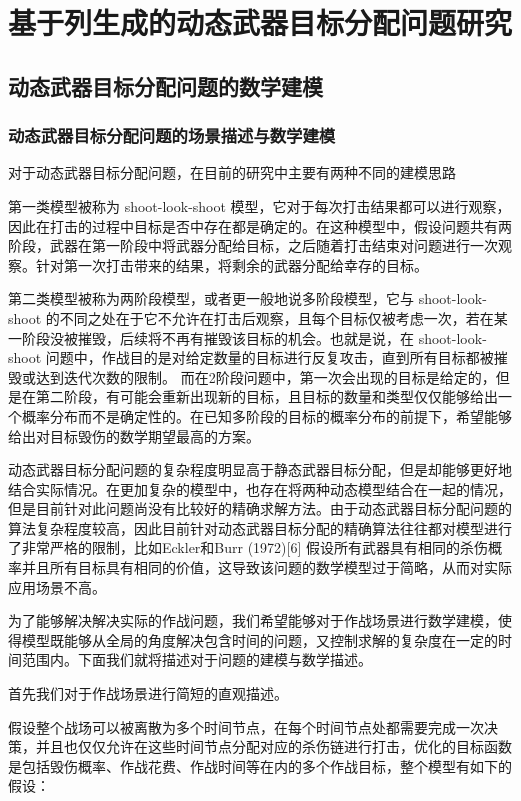 



\chapter{基于列生成的动态武器目标分配问题研究}
\section{动态武器目标分配问题的数学建模}
\subsection{动态武器目标分配问题的场景描述与数学建模}
对于动态武器目标分配问题，在目前的研究中主要有两种不同的建模思路

第一类模型被称为 shoot-look-shoot 模型，它对于每次打击结果都可以进行观察，因此在打击的过程中目标是否中存在都是确定的。在这种模型中，假设问题共有两阶段，武器在第一阶段中将武器分配给目标，之后随着打击结束对问题进行一次观察。针对第一次打击带来的结果，将剩余的武器分配给幸存的目标。

第二类模型被称为两阶段模型，或者更一般地说多阶段模型，它与 shoot-look-shoot 的不同之处在于它不允许在打击后观察，且每个目标仅被考虑一次，若在某一阶段没被摧毁，后续将不再有摧毁该目标的机会。也就是说，在 shoot-look-shoot 问题中，作战目的是对给定数量的目标进行反复攻击，直到所有目标都被摧毁或达到迭代次数的限制。 而在2阶段问题中，第一次会出现的目标是给定的，但是在第二阶段，有可能会重新出现新的目标，且目标的数量和类型仅仅能够给出一个概率分布而不是确定性的。在已知多阶段的目标的概率分布的前提下，希望能够给出对目标毁伤的数学期望最高的方案。

动态武器目标分配问题的复杂程度明显高于静态武器目标分配，但是却能够更好地结合实际情况。在更加复杂的模型中，也存在将两种动态模型结合在一起的情况，但是目前针对此问题尚没有比较好的精确求解方法。由于动态武器目标分配问题的算法复杂程度较高，因此目前针对动态武器目标分配的精确算法往往都对模型进行了非常严格的限制，比如Eckler和Burr (1972)[6] 假设所有武器具有相同的杀伤概率并且所有目标具有相同的价值，这导致该问题的数学模型过于简略，从而对实际应用场景不高。

为了能够解决解决实际的作战问题，我们希望能够对于作战场景进行数学建模，使得模型既能够从全局的角度解决包含时间的问题，又控制求解的复杂度在一定的时间范围内。下面我们就将描述对于问题的建模与数学描述。

首先我们对于作战场景进行简短的直观描述。

假设整个战场可以被离散为多个时间节点，在每个时间节点处都需要完成一次决策，并且也仅仅允许在这些时间节点分配对应的杀伤链进行打击，优化的目标函数是包括毁伤概率、作战花费、作战时间等在内的多个作战目标，整个模型有如下的假设：

